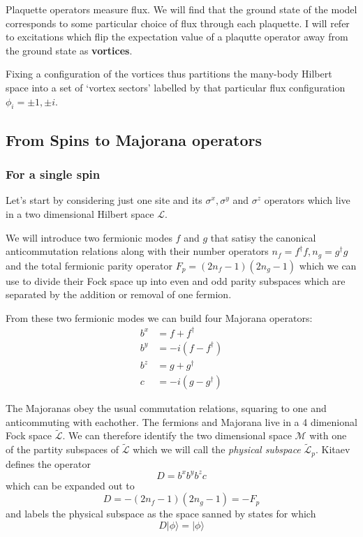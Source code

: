 Plaquette operators measure flux. We will find that the ground state of
the model corresponds to some particular choice of flux through each
plaquette. I will refer to excitations which flip the expectation value
of a plaqutte operator away from the ground state as \textbf{vortices}.

Fixing a configuration of the vortices thus partitions the many-body
Hilbert space into a set of `vortex sectors' labelled by that particular
flux configuration \(\phi_i = \pm 1,\pm i\).

\hypertarget{from-spins-to-majorana-operators}{%
\subsection{From Spins to Majorana
operators}\label{from-spins-to-majorana-operators}}

\hypertarget{for-a-single-spin}{%
\subsubsection{For a single spin}\label{for-a-single-spin}}

Let's start by considering just one site and its \(\sigma^x, \sigma^y\)
and \(\sigma^z\) operators which live in a two dimensional Hilbert space
\(\mathcal{L}\).

We will introduce two fermionic modes \(f\) and \(g\) that satisy the
canonical anticommutation relations along with their number operators
\(n_f = f^\dagger f, n_g = g^\dagger g\) and the total fermionic parity
operator \(F_p = (2n_f - 1)(2n_g - 1)\) which we can use to divide their
Fock space up into even and odd parity subspaces which are separated by
the addition or removal of one fermion.

From these two fermionic modes we can build four Majorana operators:
\[\begin{aligned}
b^x &= f + f^\dagger\\
b^y &= -i(f - f^\dagger)\\
b^z &= g + g^\dagger\\
c   &= -i(g - g^\dagger)
\end{aligned}\]

The Majoranas obey the usual commutation relations, squaring to one and
anticommuting with eachother. The fermions and Majorana live in a 4
dimenional Fock space \(\mathcal{\tilde{L}}\). We can therefore identify
the two dimensional space \(\mathcal{M}\) with one of the partity
subspaces of \(\mathcal{\tilde{L}}\) which we will call the
\emph{physical subspace} \(\mathcal{\tilde{L}}_p\). Kitaev defines the
operator \[D = b^xb^yb^zc\] which can be expanded out to
\[D = -(2n_f - 1)(2n_g - 1) = -F_p\] and labels the physical subspace as
the space sanned by states for which \[ D|\phi\rangle = |\phi\rangle\]

